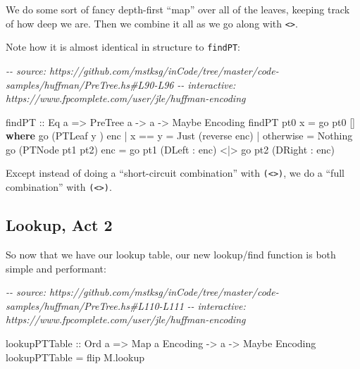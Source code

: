 \documentclass[]{article}
\newenvironment{Shaded}{}{}
\newcommand{\CommentTok}[1]{\textcolor[rgb]{0.38,0.63,0.69}{\textit{#1}}}
\newcommand{\DataTypeTok}[1]{\textcolor[rgb]{0.56,0.13,0.00}{#1}}
\newcommand{\FunctionTok}[1]{\textcolor[rgb]{0.02,0.16,0.49}{#1}}
\newcommand{\KeywordTok}[1]{\textcolor[rgb]{0.00,0.44,0.13}{\textbf{#1}}}
\newcommand{\NormalTok}[1]{#1}
\newcommand{\OperatorTok}[1]{\textcolor[rgb]{0.40,0.40,0.40}{#1}}
\newcommand{\OtherTok}[1]{\textcolor[rgb]{0.00,0.44,0.13}{#1}}
\begin{document}
We do some sort of fancy depth-first ``map'' over all of the leaves, keeping
track of how deep we are. Then we combine it all as we go along with
\texttt{\textless{}\textgreater{}}.

Note how it is almost identical in structure to \texttt{findPT}:

\begin{Shaded}
\begin{Highlighting}[]
\CommentTok{{-}{-} source: https://github.com/mstksg/inCode/tree/master/code{-}samples/huffman/PreTree.hs\#L90{-}L96}
\CommentTok{{-}{-} interactive: https://www.fpcomplete.com/user/jle/huffman{-}encoding}

\OtherTok{findPT ::} \DataTypeTok{Eq}\NormalTok{ a }\OtherTok{=>} \DataTypeTok{PreTree}\NormalTok{ a }\OtherTok{{-}>}\NormalTok{ a }\OtherTok{{-}>} \DataTypeTok{Maybe} \DataTypeTok{Encoding}
\NormalTok{findPT pt0 x }\OtherTok{=}\NormalTok{ go pt0 []}
  \KeywordTok{where}
\NormalTok{    go (}\DataTypeTok{PTLeaf}\NormalTok{ y      ) enc }\OperatorTok{|}\NormalTok{ x }\OperatorTok{==}\NormalTok{ y    }\OtherTok{=} \DataTypeTok{Just}\NormalTok{ (}\FunctionTok{reverse}\NormalTok{ enc)}
                            \OperatorTok{|} \FunctionTok{otherwise} \OtherTok{=} \DataTypeTok{Nothing}
\NormalTok{    go (}\DataTypeTok{PTNode}\NormalTok{ pt1 pt2) enc }\OtherTok{=}\NormalTok{ go pt1 (}\DataTypeTok{DLeft}  \OperatorTok{:}\NormalTok{ enc) }\OperatorTok{<|>}
\NormalTok{                              go pt2 (}\DataTypeTok{DRight} \OperatorTok{:}\NormalTok{ enc)}
\end{Highlighting}
\end{Shaded}

Except instead of doing a ``short-circuit combination'' with
\texttt{(\textless{}\textbar{}\textgreater{})}, we do a ``full combination''
with \texttt{(\textless{}\textgreater{})}.

\hypertarget{lookup-act-2}{%
\subsection{Lookup, Act 2}\label{lookup-act-2}}

So now that we have our lookup table, our new lookup/find function is both
simple and performant:

\begin{Shaded}
\begin{Highlighting}[]
\CommentTok{{-}{-} source: https://github.com/mstksg/inCode/tree/master/code{-}samples/huffman/PreTree.hs\#L110{-}L111}
\CommentTok{{-}{-} interactive: https://www.fpcomplete.com/user/jle/huffman{-}encoding}

\OtherTok{lookupPTTable ::} \DataTypeTok{Ord}\NormalTok{ a }\OtherTok{=>} \DataTypeTok{Map}\NormalTok{ a }\DataTypeTok{Encoding} \OtherTok{{-}>}\NormalTok{ a }\OtherTok{{-}>} \DataTypeTok{Maybe} \DataTypeTok{Encoding}
\NormalTok{lookupPTTable }\OtherTok{=} \FunctionTok{flip}\NormalTok{ M.lookup}
\end{Highlighting}
\end{Shaded}
\end{document}
